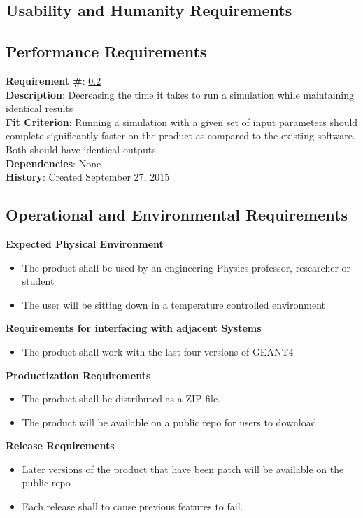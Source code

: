 \documentclass[12pt]{article}
\begin{document}
\subsection{Usability and Humanity Requirements} %

\subsection{Performance Requirements}\label{Req_Performance}

\textbf{Requirement \#}: \ref{Req_Performance}\\

\textbf{Description}: Decreasing the time it takes to run a simulation while maintaining identical results\\

\textbf{Fit Criterion}: Running a simulation with a given set of input parameters should complete significantly faster on the product as compared to the existing software. Both should have identical outputs.\\

\textbf{Dependencies}: None\\

\textbf{History}: Created September 27, 2015

\subsection{Operational and Environmental Requirements} %
\textbf{Expected Physical Environment}
\begin{itemize}
	\item The product shall be used by an engineering Physics professor, researcher or student
	\item The user will be sitting down in a temperature controlled environment
\end{itemize}
\textbf{Requirements for interfacing with adjacent Systems}
\begin{itemize}
	\item The product shall work with the last four versions of GEANT4
\end{itemize}
\textbf{Productization Requirements}
\begin{itemize}
	\item The product shall be distributed as a ZIP file.
	\item The product will be available on a public repo for users to download
\end{itemize}
\textbf{Release Requirements}
\begin{itemize}
	\item Later versions of the product that have been patch will be available on the public repo
	\item Each release shall to cause previous features to fail.
\end{itemize}
\end{document}
